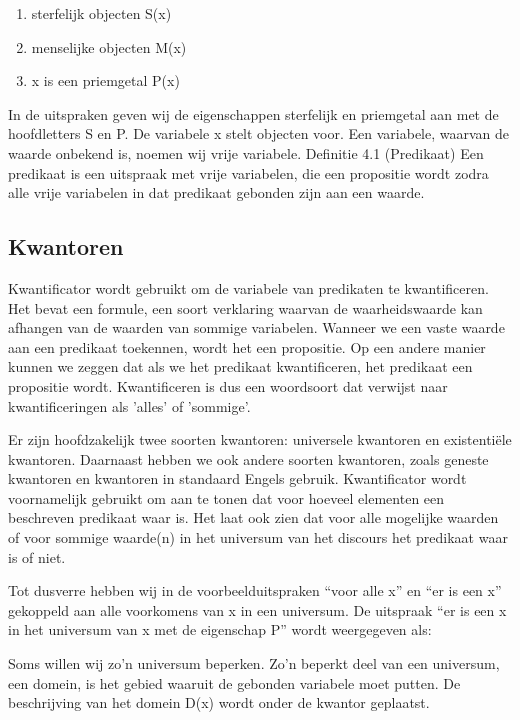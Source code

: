 \documentclass{article}
\begin{document}
	\begin{enumerate}
		\item sterfelijk objecten S(x)
		\item menselijke objecten M(x)
		\item x is een priemgetal P(x)
	\end{enumerate}
	
	
	
	In de uitspraken geven wij de eigenschappen sterfelijk en priemgetal aan met de hoofdletters
	S en P. De variabele x stelt objecten voor. Een variabele, waarvan de waarde onbekend
	is, noemen wij vrije variabele.
	Definitie 4.1 (Predikaat) Een predikaat is een uitspraak met vrije variabelen, die een
	propositie wordt zodra alle vrije variabelen in dat predikaat gebonden zijn aan een waarde.
	
	\subsection{Kwantoren}
	
	Kwantificator wordt gebruikt om de variabele van predikaten te kwantificeren. Het bevat een formule, een soort verklaring waarvan de waarheidswaarde kan afhangen van de waarden van sommige variabelen. Wanneer we een vaste waarde aan een predikaat toekennen, wordt het een propositie. Op een andere manier kunnen we zeggen dat als we het predikaat kwantificeren, het predikaat een propositie wordt. Kwantificeren is dus een woordsoort dat verwijst naar kwantificeringen als 'alles' of 'sommige'.
	
	Er zijn hoofdzakelijk twee soorten kwantoren: universele kwantoren en existentiële kwantoren. Daarnaast hebben we ook andere soorten kwantoren, zoals geneste kwantoren en kwantoren in standaard Engels gebruik. Kwantificator wordt voornamelijk gebruikt om aan te tonen dat voor hoeveel elementen een beschreven predikaat waar is. Het laat ook zien dat voor alle mogelijke waarden of voor sommige waarde(n) in het universum van het discours het predikaat waar is of niet.
	
	
	Tot dusverre hebben wij in de voorbeelduitspraken “voor alle x” en “er is een x” gekoppeld
	aan alle voorkomens van x in een universum. De uitspraak “er is een x in het
	universum van x met de eigenschap P” wordt weergegeven als:
	
	
	Soms willen wij zo’n universum beperken. Zo’n beperkt deel van een universum, een
	domein, is het gebied waaruit de gebonden variabele moet putten. De beschrijving van
	het domein D(x) wordt onder de kwantor geplaatst.
	
\end{document}
